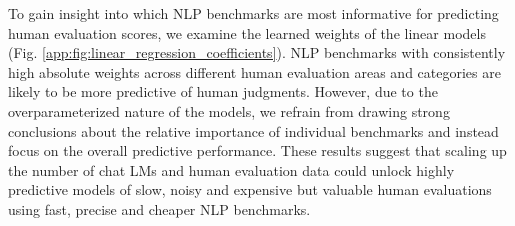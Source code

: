 To gain insight into which NLP benchmarks are most informative for predicting human evaluation scores, we examine the learned weights of the linear models (Fig. \ref{app:fig:linear_regression_coefficients}). NLP benchmarks with consistently high absolute weights across different human evaluation areas and categories are likely to be more predictive of human judgments. However, due to the overparameterized nature of the models, we refrain from drawing strong conclusions about the relative importance of individual benchmarks and instead focus on the overall predictive performance.
These results suggest that scaling up the number of chat LMs and human evaluation data could unlock highly predictive models of slow, noisy and expensive but valuable human evaluations using fast, precise and cheaper NLP benchmarks.